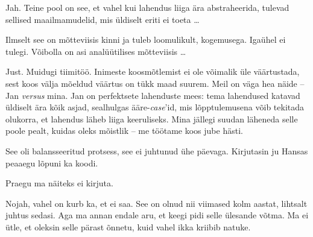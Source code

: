 Jah. Teine pool on see, et vahel kui lahendus liiga ära abstraheerida, tulevad sellised 
maailmamudelid, mis üldiselt eriti ei toeta \ldots 


Ilmselt see on 
mõtteviisis kinni ja tuleb loomulikult, kogemusega. Igaühel ei tulegi. 
Võibolla on asi analüütilises mõtteviisis \ldots 


Just. Muidugi tiimitöö. Inimeste koosmõtlemist ei ole võimalik üle väärtustada, sest koos välja mõeldud väärtus on tükk maad 
suurem. Meil on väga hea näide -- Jan \emph{versus} mina. Jan on 
perfektsete lahenduste mees: tema lahendused katavad üldiselt ära kõik asjad, sealhulgas
ääre-\emph{case}'id, mis lõpptulemusena võib tekitada olukorra, et lahendus 
läheb liiga keeruliseks. Mina jällegi suudan läheneda selle poole pealt, kuidas 
oleks mõistlik -- me töötame koos jube hästi. 


See oli balansseeritud protsess, see ei juhtunud ühe päevaga. 
Kirjutasin ju Hansas peaaegu lõpuni ka koodi. 


Praegu ma näiteks ei kirjuta.


Nojah, vahel on kurb ka, et ei saa. See on 
olnud nii viimased kolm aastat, lihtsalt juhtus sedasi. Aga ma annan endale aru, et keegi pidi 
selle ülesande võtma. Ma ei ütle, et oleksin selle pärast õnnetu, 
kuid vahel ikka kriibib natuke.

